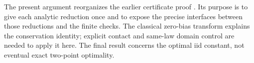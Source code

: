The present argument reorganizes the earlier certificate proof
\cite{kolodziejekrodziewicz2026exact}. Its purpose is to give each
analytic reduction once and to expose the precise interfaces between
those reductions and the finite checks. The classical zero-bias
transform \cite{GoldsteinReinert1997} explains the conservation
identity; explicit contact and same-law domain control are needed to
apply it here. The final result concerns the optimal iid constant,
not eventual exact two-point optimality.
